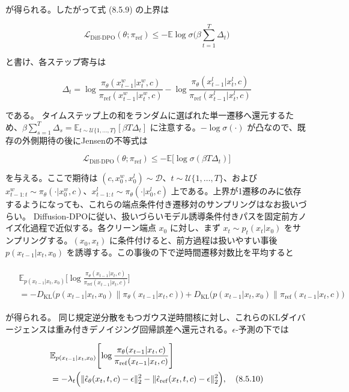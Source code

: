 が得られる。したがって式 (8.5.9) の上界は

\[
\mathcal{L}_{\mathrm{Diff\text{-}DPO}}(\theta;\pi_{\mathrm{ref}})\le-\mathbb{E}\log\sigma\Biggl(\beta\sum_{t=1}^T\Delta_t\Biggr)
\]


と書け、各ステップ寄与は

\[
\Delta_t=\log\frac{\pi_\theta(x_{t-1}^w|x_t^w,c)}{\pi_{\mathrm{ref}}(x_{t-1}^w|x_t^w,c)}
-\log\frac{\pi_\theta(x_{t-1}^l|x_t^l,c)}{\pi_{\mathrm{ref}}(x_{t-1}^l|x_t^l,c)}
\]


である。
タイムステップ上の和をランダムに選ばれた単一遷移へ還元するため、$\beta\sum_{s=1}^T\Delta_s=\mathbb{E}_{t\sim\mathcal{U}\{1,\ldots,T\}}[\beta T\Delta_t]$ に注意する。$-\log\sigma(\cdot)$ が凸なので、既存の外側期待の後にJensenの不等式は

\[
\mathcal{L}_{\mathrm{Diff\text{-}DPO}}(\theta;\pi_{\mathrm{ref}})\le-\mathbb{E}\bigl[\log\sigma(\beta T\Delta_t)\bigr]
\]


を与える。ここで期待は $(c,x_0^w,x_0^l)\sim\mathcal{D}$、$t\sim\mathcal{U}\{1,\ldots,T\}$、および $x_{t-1:t}^w\sim\pi_\theta(\cdot|x_0^w,c)$、$x_{t-1:t}^l\sim\pi_\theta(\cdot|x_0^l,c)$ 上である。上界が1遷移のみに依存するようになっても、これらの端点条件付き遷移対のサンプリングはなお扱いづらい。
Diffusion-DPOに従い、扱いづらいモデル誘導条件付きパスを固定前方ノイズ化過程で近似する。各クリーン端点 $x_0$ に対し、まず $x_t\sim p_t(x_t|x_0)$ をサンプリングする。$(x_0,x_t)$ に条件付けると、前方過程は扱いやすい事後 $p(x_{t-1}|x_t,x_0)$ を誘導する。この事後の下で逆時間遷移対数比を平均すると

\begin{align*}
\begin{aligned}
&\mathbb{E}_{p(x_{t-1}|x_t,x_0)}\Biggl[\log\frac{\pi_\theta(x_{t-1}|x_t,c)}{\pi_{\mathrm{ref}}(x_{t-1}|x_t,c)}\Biggr] \\
&=-D_{\mathrm{KL}}\bigl(p(x_{t-1}|x_t,x_0)\|\pi_\theta(x_{t-1}|x_t,c)\bigr)
+D_{\mathrm{KL}}\bigl(p(x_{t-1}|x_t,x_0)\|\pi_{\mathrm{ref}}(x_{t-1}|x_t,c)\bigr)
\end{aligned}
\end{align*}


が得られる。
同じ規定逆分散をもつガウス逆時間核に対し、これらのKLダイバージェンスは重み付きデノイジング回帰誤差へ還元される。$\epsilon$-予測の下では

\begin{align*}
\begin{aligned}
&\mathbb{E}_{p(x_{t-1}|x_t,x_0)}\Biggl[\log\frac{\pi_\theta(x_{t-1}|x_t,c)}{\pi_{\mathrm{ref}}(x_{t-1}|x_t,c)}\Biggr] \\
&=-\lambda_t\Bigl(\|\hat{\epsilon}_\theta(x_t,t,c)-\epsilon\|_2^2-\|\hat{\epsilon}_{\mathrm{ref}}(x_t,t,c)-\epsilon\|_2^2\Bigr), \quad (8.5.10)
\end{aligned}
\end{align*}


